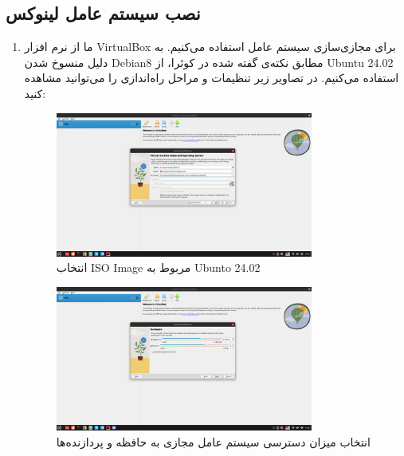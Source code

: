 \documentclass[12pt]{article}
\begin{document}
        \subsection{نصب سیستم عامل لینوکس}

        \begin{enumerate}
            \item 

        ما از نرم افزار 
        \textenglish{VirtualBox}
        برای مجازی‌سازی سیستم عامل استفاده می‌کنیم. به دلیل منسوخ شدن 
        \textenglish{Debian8}
        مطابق نکته‌ی گفته شده در کوئرا، از 
        \textenglish{Ubuntu 24.02}
        استفاده می‌کنیم. در تصاویر زیر تنظیمات و مراحل راه‌اندازی را می‌توانید مشاهده کنید:
    
	
	\begin{figure}[H]
		\centering
		\includegraphics[width=0.8\textwidth]{report1-resources/1.png}
		\caption{انتخاب \textenglish{ISO Image} مربوط به \textenglish{Ubunto 24.02}}
	\end{figure}

        \begin{figure}[H]
		\centering
		\includegraphics[width=0.8\textwidth]{report1-resources/2.png}
		\caption{انتخاب میزان دسترسی سیستم عامل مجازی به حافظه و پردازنده‌ها}
	\end{figure}


\end{enumerate}
\end{document}
